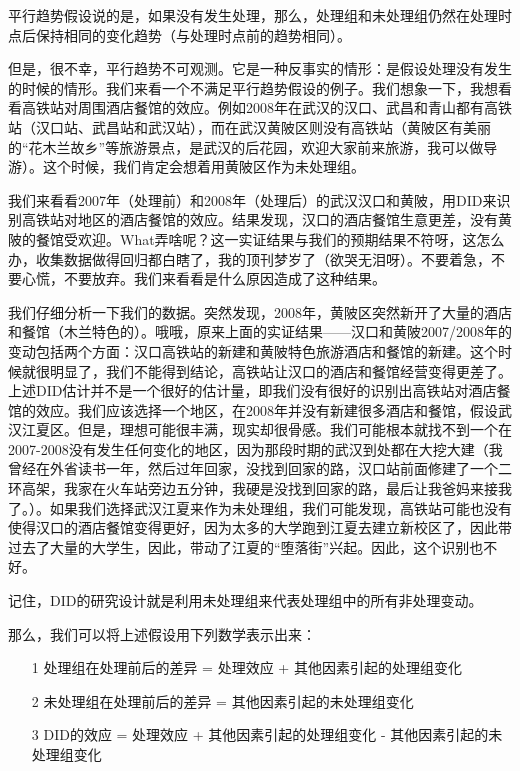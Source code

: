 \documentclass[cn,10pt,math=newtx,citestyle=gb7714-2015,bibstyle=gb7714-2015]{elegantbook}
\begin{document}
	平行趋势假设说的是，如果没有发生处理，那么，处理组和未处理组仍然在处理时点后保持相同的变化趋势（与处理时点前的趋势相同）。
	
	但是，很不幸，平行趋势不可观测。它是一种反事实的情形：是假设处理没有发生的时候的情形。我们来看一个不满足平行趋势假设的例子。我们想象一下，我想看看高铁站对周围酒店餐馆的效应。例如2008年在武汉的汉口、武昌和青山都有高铁站（汉口站、武昌站和武汉站），而在武汉黄陂区则没有高铁站（黄陂区有美丽的“花木兰故乡”等旅游景点，是武汉的后花园，欢迎大家前来旅游，我可以做导游）。这个时候，我们肯定会想着用黄陂区作为未处理组。
	
	我们来看看2007年（处理前）和2008年（处理后）的武汉汉口和黄陂，用DID来识别高铁站对地区的酒店餐馆的效应。结果发现，汉口的酒店餐馆生意更差，没有黄陂的餐馆受欢迎。What弄啥呢？这一实证结果与我们的预期结果不符呀，这怎么办，收集数据做得回归都白瞎了，我的顶刊梦岁了（欲哭无泪呀）。不要着急，不要心慌，不要放弃。我们来看看是什么原因造成了这种结果。
	
	我们仔细分析一下我们的数据。突然发现，2008年，黄陂区突然新开了大量的酒店和餐馆（木兰特色的）。哦哦，原来上面的实证结果——汉口和黄陂2007/2008年的变动包括两个方面：汉口高铁站的新建和黄陂特色旅游酒店和餐馆的新建。这个时候就很明显了，我们不能得到结论，高铁站让汉口的酒店和餐馆经营变得更差了。上述DID估计并不是一个很好的估计量，即我们没有很好的识别出高铁站对酒店餐馆的效应。我们应该选择一个地区，在2008年并没有新建很多酒店和餐馆，假设武汉江夏区。但是，理想可能很丰满，现实却很骨感。我们可能根本就找不到一个在2007-2008没有发生任何变化的地区，因为那段时期的武汉到处都在大挖大建（我曾经在外省读书一年，然后过年回家，没找到回家的路，汉口站前面修建了一个二环高架，我家在火车站旁边五分钟，我硬是没找到回家的路，最后让我爸妈来接我了。）。如果我们选择武汉江夏来作为未处理组，我们可能发现，高铁站可能也没有使得汉口的酒店餐馆变得更好，因为太多的大学跑到江夏去建立新校区了，因此带过去了大量的大学生，因此，带动了江夏的“堕落街”兴起。因此，这个识别也不好。
	
	记住，DID的研究设计就是利用未处理组来代表处理组中的所有非处理变动。
	
	那么，我们可以将上述假设用下列数学表示出来：
	
	\begin{itemize}
		\item [1] 处理组在处理前后的差异 = 处理效应 + 其他因素引起的处理组变化
		\item [2] 未处理组在处理前后的差异 = 其他因素引起的未处理组变化
		\item [3] DID的效应 = 处理效应 + 其他因素引起的处理组变化 - 其他因素引起的未处理组变化
	\end{itemize}
	
\end{document}
